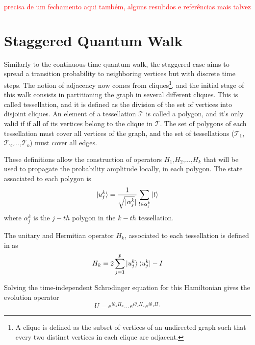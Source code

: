              \textcolor{red}{precisa de um fechamento aqui também, alguns resultdos e referências mais talvez}
             
                \clearpage
                
            \section{Staggered Quantum Walk}\label{stagWalk}
            	Similarly to the continuous-time quantum walk, the staggered case aims to spread a transition probability to neighboring vertices but with discrete time steps. The notion of adjacency now comes from cliques\footnote{A clique is defined as the subset of vertices of an undirected graph such that every two distinct vertices in each clique are adjacent.}, and the initial stage of this walk consists in partitioning the graph in several different cliques. This is called tessellation, and it is defined as the division of the set of vertices into disjoint cliques. An element of a tessellation $\mathscr{T}$ is called a polygon, and it's only valid if if all of its vertices belong to the clique in $\mathscr{T}$. The set of polygons of each tessellation must cover all vertices of the graph, and the set of tessellations ($\mathscr{T}_{1}$,$\mathscr{T}_{2}$,...,$\mathscr{T}_{k}$) must cover all edges.\par
            	These definitions allow the construction of operators $H_1$,$H_2$,...,$H_k$ that will be used to propagate the probability amplitude locally, in each polygon. The state associated to each polygon is
            	\begin{equation}
            	    \ket{u_{j}^{k}} = \frac{1}{\sqrt{\mathopen|\alpha_{j}^{k}}\mathclose|}\sum_{l\in\alpha_{j}^{k}}\ket{l}
            	\end{equation}
            	where $\alpha_{j}^{k}$ is the $j-th$ polygon in the $k-th$ tessellation.\par
            	The unitary and Hermitian operator $H_k$, associated to each tessellation is defined in \cite{portugal2017b} as
            	\begin{equation}
            	    H_k = 2\sum_{j=1}^{p}\ket{u_{j}^{k}}\bra{u_{j}^{k}} - I
            	    \label{eq:StagHamil}
            	\end{equation}\par
            	Solving the time-independent Schrodinger equation for this Hamiltonian gives the evolution operator
            	\begin{equation}
            	    U = e^{i\theta_{k}H_{k}}...e^{i\theta_{2}H_{2}}e^{i\theta_{1}H_{1}}
            	    \label{eq:stagWalkUnmodOp}
            	\end{equation}
